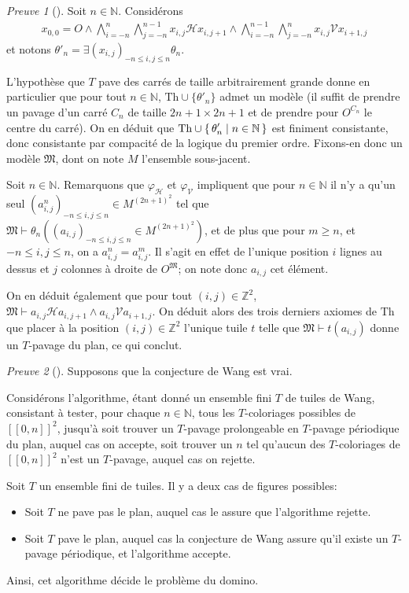 \documentclass{scrartcl}
\renewcommand{\le}{\leqslant}
\renewcommand{\ge}{\geqslant}
\newcommand{\N}{\mathbb N}
\newcommand{\Z}{\mathbb Z}
\renewcommand{\H}{\mathrel{\mathcal H}}
\newcommand{\V}{\mathrel{\mathcal V}}
\theoremstyle{definition}
\theoremstyle{remark}
\newtheorem{preuve}{Preuve}
\begin{document}
\begin{preuve}[]
  Soit $n\in\N$. Considérons
  \begin{align}
    \tag{$\theta_n$}
    x_{0,0}=O\land\bigwedge_{i=-n}^n\bigwedge_{j=-n}^{n-1} x_{i,j}\H x_{i,j+1}\land \bigwedge_{i=-n}^{n-1}\bigwedge_{j=-n}^n x_{i,j}\V x_{i+1,j}
  \end{align}
  et notons $\theta'_n=\exists(x_{i,j})_{-n\le i,j\le n}\theta_n$.

  L'hypothèse que $T$ pave des carrés de taille arbitrairement grande donne en particulier que pour tout $n\in\N$, $\mathrm{Th}\cup \{\theta'_n\}$ admet un modèle (il suffit de prendre un pavage d'un carré $C_n$ de taille $2n+1\times 2n+1$ et de prendre pour $O^{C_n}$ le centre du carré). On en déduit que $\displaystyle\mathrm{Th}\cup \set{\theta'_n|n\in\N}$ est finiment consistante, donc consistante par compacité de la logique du premier ordre. Fixons-en donc un modèle $\mathfrak M$, dont on note $M$ l'ensemble sous-jacent.

  Soit $n\in\N$. Remarquons que $\varphi_\mathcal H$ et $\varphi_\mathcal V$ impliquent que pour $n\in\N$ il n'y a qu'un seul $(a_{i,j}^n)_{-n\le i,j\le n}\in M^{(2n+1)^2}$ tel que $\mathfrak M\vdash \theta_n\left((a_{i,j})_{-n\le i,j\le n}\in M^{(2n+1)^2}\right)$, et de plus que pour $m\ge n$, et $-n\le i,j\le n$, on a $a_{i,j}^n=a_{i,j}^m$. Il s'agit en effet de l'unique position $i$ lignes au dessus et $j$ colonnes à droite de $O^\mathfrak M$; on note donc $a_{i,j}$ cet élément.

  On en déduit également que pour tout $(i,j)\in\Z^2$, $\mathfrak M\vdash a_{i,j}\H a_{i,j+1}\land a_{i,j}\V a_{i+1,j}$. On déduit alors des trois derniers axiomes de $\mathrm{Th}$ que placer à la position $(i,j)\in\Z^2$ l'unique tuile $t$ telle que $\mathfrak M\vdash t(a_{i,j})$ donne un $T$-pavage du plan, ce qui conclut. 
\end{preuve}

\begin{preuve}[]
  Supposons que la conjecture de Wang est vrai.
  
  Considérons l'algorithme, étant donné un ensemble fini $T$ de tuiles de Wang, consistant à tester, pour chaque $n\in\N$, tous les $T$-coloriages possibles de $[\![0,n]\!]^2$, jusqu'à soit trouver un $T$-pavage prolongeable en $T$-pavage périodique du plan, auquel cas on accepte, soit trouver un $n$ tel qu'aucun des $T$-coloriages de $[\![0,n]\!]^2$ n'est un $T$-pavage, auquel cas on rejette.

  Soit $T$ un ensemble fini de tuiles. Il y a deux cas de figures possibles:
  \begin{itemize}
    \item Soit $T$ ne pave pas le plan, auquel cas le  assure que l'algorithme rejette.
    \item Soit $T$ pave le plan, auquel cas la conjecture de Wang assure qu'il existe un $T$-pavage périodique, et l'algorithme accepte.
  \end{itemize}

  Ainsi, cet algorithme décide le problème du domino.
\end{preuve}
\end{document}

